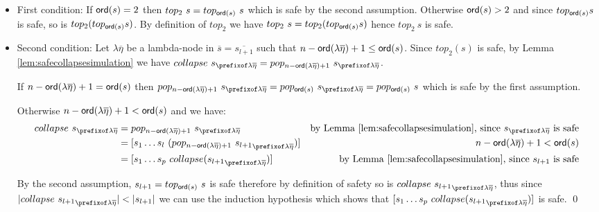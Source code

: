 \documentclass{article}
\theoremstyle{remark}
\theoremstyle{definition}
\newcommand\orddec\overline
\begin{document}
\begin{itemize}
\item First condition: If ${\sf ord}(s)=2$ then $top_2~s = top_{{\sf ord}(s)}~s$ which is safe by the second assumption. Otherwise ${\sf ord}(s)>2$ and since $top_{{\sf ord}(s)} s$ is safe, so is $top_2(top_{{\sf ord}(s)} s)$. By definition of $top_2$ we have $top_2~s = top_2(top_{{\sf ord}(s)} s)$ hence $top_2~s$ is safe.

\item Second condition: Let $\lambda \overline{\eta}$ be a lambda-node in $\orddec{s} = \orddec{s_{l+1}}$ such that $n-{\sf ord}(\lambda \overline{\eta})+1 \leq {\sf ord}(s)$.
Since $top_2(s)$ is safe, by Lemma \ref{lem:safecollapsesimulation} we have
$collapse~s_{\prefixof \lambda \overline{\eta}} = pop_{n-\ord{\lambda \overline{\eta}}+1}~s_{\prefixof \lambda \overline{\eta}}$.

If $n-{\sf ord}(\lambda \overline{\eta})+1 = {\sf ord}(s)$ then
$pop_{n-\ord{\lambda \overline{\eta}}+1}~s_{\prefixof \lambda \overline{\eta}} = pop_{\ord{s}}~s_{\prefixof\lambda\overline\eta} = pop_{\ord{s}}~s$ which is safe by the first assumption.

Otherwise $n-{\sf ord}(\lambda \overline{\eta})+1 < {\sf ord}(s)$ and we have:
\begin{align*}
  collapse~s_{\prefixof\lambda\overline\eta}
      &= pop_{n-\ord{\lambda \overline{\eta}}+1}~s_{\prefixof\lambda\overline\eta}
      & \mbox{by Lemma \ref{lem:safecollapsesimulation}, since $s_{\prefixof\lambda\overline\eta}$ is safe} \\
  &= [ s_1 \ldots s_l\ (pop_{n-\ord{\lambda\overline\eta}+1}~ {s_{l+1}}_{\prefixof\lambda\overline\eta}) ]
   & \mbox{$n-\ord{\lambda \overline{\eta}}+1<\ord{s}$}  \\
  &= [s_1 \ldots s_p~collapse({s_{l+1}}_{\prefixof\lambda\overline\eta}) ]
  & \mbox{by Lemma \ref{lem:safecollapsesimulation}, since $s_{l+1}$ is safe}
\end{align*}

By the second assumption, $s_{l+1} = top_{{\sf ord}(s)}~s$ is safe therefore by definition
of safety so is $collapse~{s_{l+1}}_{\prefixof\lambda\overline\eta}$, thus
since $|collapse~{s_{l+1}}_{\prefixof\lambda\overline\eta}| < |s_{l+1}|$ we can use the induction hypothesis which shows that $[s_1 \ldots s_p~collapse({s_{l+1}}_{\prefixof\lambda\overline\eta}) ]$ is safe.
\qed
\end{itemize}
\end{document}
